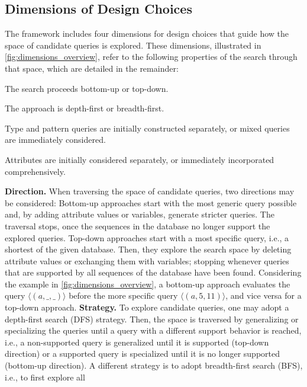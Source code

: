 \subsection{Dimensions of Design Choices}
\label{sec:dimensions}
The \sys{} framework includes four dimensions for design choices that guide how
the space of candidate queries is explored. These dimensions, illustrated in
\autoref{fig:dimensions_overview}, refer to the following properties of the search
through that space, which are detailed in the remainder:
\begin{description}[itemsep=.3em,font=\normalfont\itshape,
labelindent=0em,leftmargin=2.5em]
    \item[Direction:] The search proceeds bottom-up or top-down.
    \item[Strategy:] The approach is depth-first or
    breadth-first.
    \item[Construction:] Type and pattern queries are initially
    constructed separately, or mixed queries are immediately
    considered.
    \item[Attributes:] Attributes are initially considered
    separately, or immediately incorporated comprehensively.
\end{description}
\textbf{Direction.}
When traversing the space of candidate queries, two directions may be considered:
Bottom-up approaches start with the most generic query possible and, by adding
attribute values or variables, generate stricter queries.
The traversal stops, once the sequences in the database no longer support the
explored queries.
Top-down approaches start with a most specific query,
i.e., a shortest  of the given database.
Then, they explore the search space by deleting attribute values or exchanging
them with variables; stopping whenever queries that are supported by all sequences
of the database have been found. Considering the example in
\autoref{fig:dimensions_overview}, a bottom-up approach evaluates the query
$\langle (a,\_,\_) \rangle$ before the more specific query $\langle (a,5,11)
\rangle$, and vice versa for a top-down approach.
\textbf{Strategy.} To explore candidate queries, one may adopt a
depth-first search (DFS) strategy. Then, the space is traversed by
generalizing or specializing the queries until a query with a different
support behavior is reached, i.e., a non-supported query is generalized
until it is supported (top-down direction) or a supported query is
specialized until it is no longer supported (bottom-up direction). A
different strategy
is to adopt breadth-first search (BFS), i.e., to first explore all
